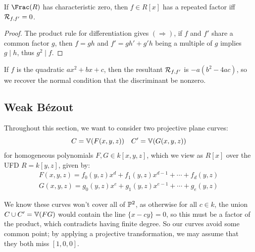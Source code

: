 \documentclass{article}
\begin{document}
\begin{proposition}
    If $\Frac(R)$ has characteristic zero, then $f\in R[x]$ has a repeated factor iff $\mathcal{R}_{f,f'}=0$.
    \begin{proof}
        The product rule for differentiation gives $(\Rightarrow)$, if $f$ and $f'$ share a common factor $g$, then $f=gh$ and $f'=gh' + g'h$ being a multiple of $g$ implies $g\mid h$, thus $g^2\mid f$.
    \end{proof}
\end{proposition}

If $f$ is the quadratic $ax^2 + bx + c$, then the resultant $\mathcal{R}_{f,f'}$ is $-a(b^2-4ac)$, so we recover the normal condition that the discriminant be nonzero.

\subsection{Weak B\'ezout}

Throughout this section, we want to consider two projective plane curves: \[
C = \mathbb{V}(F(x,y,z)) \quad C' = \mathbb{V}(G(x,y,z))
\] for homogeneous polynomials $F,G\in k[x,y,z]$, which we view as $R[x]$ over the UFD $R=k[y,z]$, given by:
\begin{equation}
\begin{gathered}
    F(x,y,z) = f_0(y,z)x^d + f_1(y,z)x^{d-1} + \cdots + f_d(y,z) \\
    G(x,y,z) = g_0(y,z)x^e + g_1(y,z)x^{e-1} + \cdots + g_e(y,z)
\end{gathered}
\end{equation}

We know these curves won't cover all of $\mathbb{P}^2$, as otherwise for all $c\in k$, the union $C\cup C' = \mathbb{V}(FG)$ would contain the line $\{x-cy\}=0$, so this must be a factor of the product, which contradicts having finite degree. So our curves avoid some common point; by applying a projective transformation, we may assume that they both miss $[1,0,0]$.
\end{document}
